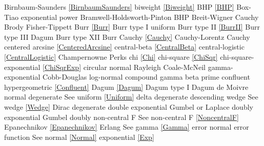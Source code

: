 Birnbaum-Saunders				\dotfill	\eqref{BirnbaumSaunders}			\ncite
biweight						\dotfill	\eqref{Biweight}					\ncite
BHP								\dotfill	\eqref{BHP}							\ncite	%
Box-Tiao						\dotfill	exponential power					\ncite
Bramwell-Holdsworth-Pinton 		\dotfill	BHP 								\ncite	%
Breit-Wigner  					\dotfill	Cauchy 								\ncite	%
Brody							\dotfill	Fisher-Tippett						\ncite	%
Burr							\dotfill	\eqref{Burr} 						\ncite	%
Burr type I						\dotfill	uniform 							\ncite	%
Burr type II					\dotfill	\eqref{BurrII} 						\ncite	%
Burr type III					\dotfill	Dagum								\ncite	%
Burr type XII					\dotfill	Burr 								\ncite	%
%
Cauchy	 						\dotfill	\eqref{Cauchy} 							%
Cauchy-Lorentz 					\dotfill	Cauchy 								\ncite	%
centered arcsine 				\dotfill	\eqref{CenteredArcsine} 			\ncite	%
central-beta 					\dotfill	\eqref{CentralBeta}					\mcite{\self}
central-logistic 				\dotfill	\eqref{CentralLogistic}				\mcite{\self}
Champernowne					\dotfill	Perks								\ncite
chi								\dotfill	\eqref{Chi}							\ncite	%
chi-square						\dotfill	\eqref{ChiSqr}						\ncite	%
chi-square-exponential			\dotfill	\eqref{ChiSqrExp}					\mcite{\self}	%
circular normal					\dotfill	Rayleigh							\ncite %
Coale-McNeil 					\dotfill	gamma-exponential 					     %
Cobb-Douglas					\dotfill	log-normal 							\ncite	%
compound gamma					\dotfill	beta prime								%
confluent hypergeometric 		\dotfill	\eqref{Confluent}					\ncite
%
Dagum 							\dotfill	\eqref{Dagum} 						\ncite	%
Dagum type I 					\dotfill	Dagum								\ncite	%
de Moivre						\dotfill	normal 								\ncite	%
degenerate						\dotfill	See uniform \eqref{Uniform} 		\ncite	%
delta  							\dotfill	degenerate  						\ncite 	%
descending wedge				\dotfill	See wedge \eqref{Wedge} 			\ncite	%
Dirac							\dotfill	degenerate							\ncite	
double exponential 				\dotfill	Gumbel or Laplace 					\ncite	%
doubly exponential				\dotfill	Gumbel								\ncite	%
doubly non-central F       		\dotfill	See non-central F  					\eqref{NoncentralF} 	\ncite 
%
Epanechnikov					\dotfill	\eqref{Epanechnikov}				\ncite
Erlang							\dotfill	See gamma \eqref{Gamma} 			\ncite 	%
error 							\dotfill	normal 								\ncite	%
error function					\dotfill	See normal \eqref{Normal}			\ncite	%
exponential 					\dotfill	\eqref{Exp} 						\ncite	%
